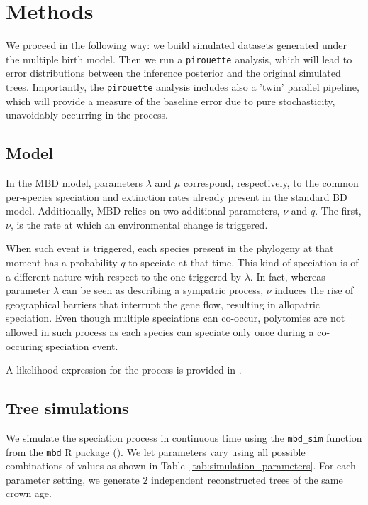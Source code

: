 \section{Methods}

We proceed in the following way: we build simulated datasets generated under the multiple birth model. Then we run a \verb;pirouette; analysis, which will lead to error distributions between the inference posterior and the original simulated trees. Importantly, the \verb;pirouette; analysis includes also a 'twin' parallel pipeline, which will provide a measure of the baseline error due to pure stochasticity, unavoidably occurring in the process.

\subsection{Model}

In the MBD model, parameters $\lambda$ and $\mu$ correspond, respectively, 
to the common per-species speciation and extinction rates 
already present in the standard BD model. 
Additionally, MBD relies on two additional parameters, $\nu$ and $q$. 
The first, $\nu$, is the rate at which an environmental change is triggered.

When such event is triggered, each species present in the phylogeny 
at that moment has a probability $q$ to speciate at that time.
This kind of speciation is of a different nature with respect to 
the one triggered by $\lambda$. 
In fact, whereas parameter $\lambda$ can be seen as 
describing a sympatric process, $\nu$ induces the rise of 
geographical barriers that interrupt the gene flow,
resulting in allopatric speciation. 
Even though multiple speciations can co-occur, 
polytomies are not allowed in such process as each species can speciate only 
once during a co-occuring speciation event.

A likelihood expression for the process is provided in \cite{mbd}.

\subsection{Tree simulations}

We simulate the speciation process in continuous time 
using the \verb;mbd_sim; function from the \verb;mbd; R package (\citep{mbd}).
We let parameters vary using all possible combinations of values 
as shown in Table~\ref{tab:simulation_parameters}.
For each parameter setting, 
we generate $2$  
independent reconstructed trees of the same crown age.


